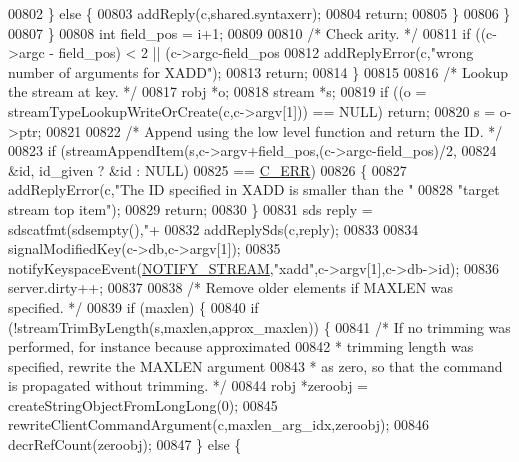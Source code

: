 \begin{DoxyCode}
{{00802             \} \textcolor{keywordflow}{else} \{
00803                 addReply(c,shared.syntaxerr);
00804                 \textcolor{keywordflow}{return};
00805             \}
00806         \}
00807     \}
00808     \textcolor{keywordtype}{int} field\_pos = i+1;
00809 
00810     \textcolor{comment}{/* Check arity. */}
00811     \textcolor{keywordflow}{if} ((c->argc - field\_pos) < 2 || (c->argc-field\_pos %
00812         addReplyError(c,\textcolor{stringliteral}{"wrong number of arguments for XADD"});
00813         \textcolor{keywordflow}{return};
00814     \}
00815 
00816     \textcolor{comment}{/* Lookup the stream at key. */}
00817     robj *o;
00818     stream *s;
00819     \textcolor{keywordflow}{if} ((o = streamTypeLookupWriteOrCreate(c,c->argv[1])) == NULL) \textcolor{keywordflow}{return};
00820     s = o->ptr;
00821 
00822     \textcolor{comment}{/* Append using the low level function and return the ID. */}
00823     \textcolor{keywordflow}{if} (streamAppendItem(s,c->argv+field\_pos,(c->argc-field\_pos)/2,
00824         &id, id\_given ? &id : NULL)
00825         == \hyperlink{server_8h_af98ac28d5f4d23d7ed5985188e6fb7d1}{C\_ERR})
00826     \{
00827         addReplyError(c,\textcolor{stringliteral}{"The ID specified in XADD is smaller than the "}
00828                         \textcolor{stringliteral}{"target stream top item"});
00829         \textcolor{keywordflow}{return};
00830     \}
00831     sds reply = sdscatfmt(sdsempty(),\textcolor{stringliteral}{"+%
00832     addReplySds(c,reply);
00833 
00834     signalModifiedKey(c->db,c->argv[1]);
00835     notifyKeyspaceEvent(\hyperlink{server_8h_a045eabb1c5cc4dd02abfbfbae1d27c84}{NOTIFY\_STREAM},\textcolor{stringliteral}{"xadd"},c->argv[1],c->db->id);
00836     server.dirty++;
00837 
00838     \textcolor{comment}{/* Remove older elements if MAXLEN was specified. */}
00839     \textcolor{keywordflow}{if} (maxlen) \{
00840         \textcolor{keywordflow}{if} (!streamTrimByLength(s,maxlen,approx\_maxlen)) \{
00841             \textcolor{comment}{/* If no trimming was performed, for instance because approximated}
00842 \textcolor{comment}{             * trimming length was specified, rewrite the MAXLEN argument}
00843 \textcolor{comment}{             * as zero, so that the command is propagated without trimming. */}
00844             robj *zeroobj = createStringObjectFromLongLong(0);
00845             rewriteClientCommandArgument(c,maxlen\_arg\_idx,zeroobj);
00846             decrRefCount(zeroobj);
00847         \} \textcolor{keywordflow}{else} \{
}}}
\end{DoxyCode}
